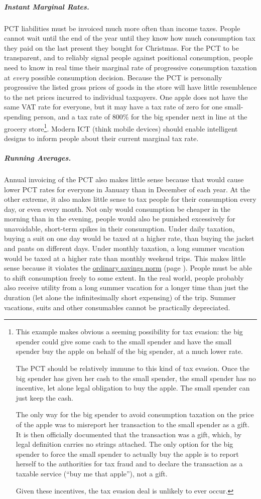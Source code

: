 \subparagraph{Instant Marginal Rates.} PCT liabilities must be invoiced much more often than income taxes. People cannot wait until the end of the year until they know how much consumption tax they paid on the last present they bought for Christmas. For the PCT to be transparent, and to reliably signal people against positional consumption, people need to know in real time their marginal rate of progressive consumption taxation at \emph{every} possible consumption decision. Because the PCT is personally progressive the listed gross prices of goods in the store will have little resemblence to the net prices incurred to individual taxpayers. One apple does not have the same VAT rate for everyone, but it may have a tax rate of zero for one small-spending person, and a tax rate of 800\% for the big spender next in line at the grocery store\footnote{
	This example makes obvious a seeming possibility for tax evasion: the big spender could give some cash to the small spender and have the small spender buy the apple on behalf of the big spender, at a much lower rate.

	The PCT should be relatively immune to this kind of tax evasion. Once the big spender has given her cash to the small spender, the small spender has no incentive, let alone legal obligation to buy the apple. The small spender can just keep the cash. 

	The only way for the big spender to avoid consumption taxation on the price of the apple was to misreport her transaction to the small spender as a gift. It is then officially documented that the transaction was a gift, which, by legal definition carries no strings attached. The only option for the big spender to force the small spender to actually buy the apple is to report herself to the authorities for tax fraud and to declare the transaction as a taxable service (``buy me that apple''), not a gift. 

	Given these incentives, the tax evasion deal is unlikely to ever occur.}. 
Modern ICT (think mobile devices) should enable intelligent designs to inform people about their current marginal tax rate.

\subparagraph{Running Averages.} Annual invoicing of the PCT also makes little sense because that would cause lower PCT rates for everyone in January than in December of each year. At the other extreme, it also makes little sense to tax people for their consumption every day, or even every month. Not only would consumption be cheaper in the morning than in the evening, people would also be punished excessively for unavoidable, short-term spikes in their consumption. Under daily taxation, buying a suit on one day would be taxed at a higher rate, than buying the jacket and pants on different days. Under monthly taxation, a long summer vacation would be taxed at a higher rate than monthly weekend trips. This makes little sense because it violates the \hyperref[sec:OSN]{ordinary savings norm} (page \pageref{sec:OSN}). People must be able to shift consumption freely to some extent. In the real world, people probably also receive utility from a long summer vacation for a longer time than just the duration (let alone the infinitesimally short expensing) of the trip. Summer vacations, suits and other consumables cannot be practically depreciated.

